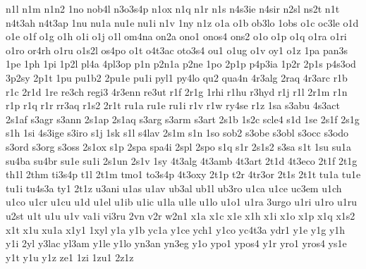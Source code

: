 {n1l
n1m
n1n2
1no
nob4l
n3o3s4p
n1ox
n1q
n1r
n1s
n4s3ie
n4sir
n2sl
ns2t
n1t
n4t3ah
n4t3ap
1nu
nu1a
nu1e
nu1i
n1v
1ny
n1z
o1a
o1b
ob3lo
1obs
o1c
oc3le
o1d
o1e
o1f
o1g
o1h
o1i
o1j
o1l
om4na
on2a
ono1
onos4
ons2
o1o
o1p
o1q
o1ra
o1ri
o1ro
or4rh
o1ru
o1s2l
os4po
o1t
o4t3ac
oto3s4
ou1
o1ug
o1v
oy1
o1z
1pa
pan3s
1pe
1ph
1pi
1p2l
pl4a
4pl3op
p1n
p2n1a
p2ne
1po
2p1p
p4p3ia
1p2r
2p1s
p4s3od
3p2sy
2p1t
1pu
pu1b2
2pu1e
pu1i
pyl1
py4lo
qu2
qua4n
4r3alg
2raq
4r3arc
r1b
r1c
2r1d
1re
re3ch
regi3
4r3enn
re3ut
r1f
2r1g
1rhi
r1hu
r3hyd
r1j
r1l
2r1m
r1n
r1p
r1q
r1r
rr3aq
r1s2
2r1t
ru1a
ru1e
ru1i
r1v
r1w
ry4se
r1z
1sa
s3abu
4s3act
2s1af
s3agr
s3ann
2s1ap
2s1aq
s3arg
s3arm
s3art
2s1b
1s2c
scle4
s1d
1se
2s1f
2s1g
s1h
1si
4s3ige
s3iro
s1j
1sk
s1l
s4lav
2s1m
s1n
1so
sob2
s3obe
s3obl
s3occ
s3odo
s3ord
s3org
s3oss
2s1ox
s1p
2spa
spa4i
2spl
2spo
s1q
s1r
2s1s2
s3sa
s1t
1su
su1a
su4ba
su4br
su1e
su1i
2s1un
2s1v
1sy
4t3alg
4t3amb
4t3art
2t1d
4t3eco
2t1f
2t1g
th1l
2thm
ti3s4p
t1l
2t1m
tmo1
to3s4p
4t3oxy
2t1p
t2r
4tr3or
2t1s
2t1t
tu1a
tu1e
tu1i
tu4s3a
ty1
2t1z
u3ani
u1as
u1av
ub3al
ub1l
ub3ro
u1ca
u1ce
uc3em
u1ch
u1co
u1cr
u1cu
u1d
u1el
u1ib
u1ic
u1la
u1le
u1lo
u1o1
u1ra
3urgo
u1ri
u1ro
u1ru
u2st
u1t
u1u
u1v
va1i
vi3ru
2vn
v2r
w2n1
x1a
x1c
x1e
x1h
x1i
x1o
x1p
x1q
x1s2
x1t
x1u
xu1a
x1y1
1xyl
y1a
y1b
yc1a
y1ce
ych1
y1co
yc4t3a
ydr1
y1e
y1g
y1h
y1i
2yl
y3lac
yl3am
y1le
y1lo
yn3an
yn3eg
y1o
ypo1
ypos4
y1r
yro1
yros4
ys1e
y1t
y1u
y1z
ze1
1zi
1zu1
2z1z
}
